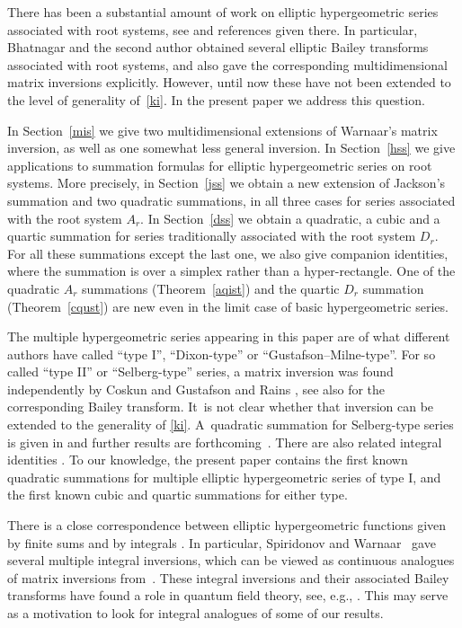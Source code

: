 \documentclass[pdftex]{sigma}%
\numberwithin{equation}{section}
\begin{document}
There has been a substantial amount of work on elliptic hypergeometric series associated with root systems, see \cite{rw} and references given there. In particular, Bhatnagar and the second author \cite{bs} obtained several elliptic Bailey transforms associated with root systems, and also gave the corresponding multidimensional matrix inversions explicitly. However, until now these have not been extended to the level of generality of~\eqref{ki}.
In the present paper we address this question.

In Section~\ref{mis} we give two multidimensional extensions of
Warnaar's matrix inversion, as well as one somewhat less general inversion. In Section~\ref{hss} we give applications to summation formulas for elliptic
hypergeometric series on root systems. More precisely, in Section~\ref{jss}
we obtain a new extension of Jackson's summation and two quadratic summations, in all three cases for series associated with the root system $A_r$.
In Section~\ref{dss} we obtain a quadratic, a cubic and a quartic summation for
series traditionally associated with the root system $D_r$. For all these summations except the last one,
we also give companion identities, where the summation is over a simplex rather than a hyper-rectangle.
One of the quadratic $A_r$ summations (Theorem~\ref{aqist}) and the quartic $D_r$ summation (Theorem~\ref{cqust}) are new even in the limit case of basic hypergeometric series.

The multiple hypergeometric series appearing in this paper are of what different authors have called ``type I'', ``Dixon-type'' or ``Gustafson--Milne-type''. For so called ``type II'' or ``Selberg-type'' series, a matrix inversion was found independently by Coskun and Gustafson \cite[equation~(4.16)]{cg} and Rains \cite[Corollary~4.3]{rai0}, see also \cite{c} for the corresponding Bailey transform.
 It~is not clear whether that inversion can be extended to the generality of \eqref{ki}.
A~quadratic summation for Selberg-type series is given in \cite[Corollary~4.3]{rel} and further results are forth\-coming~\cite{lrw}.
There are also related integral identities \cite{vdb, ra,rel,rai2}.
To our knowledge, the present paper contains the first known quadratic summations for multiple elliptic hypergeometric series of type I, and the first known cubic and quartic summations for either type.

There is a close correspondence between elliptic hypergeometric functions given by finite sums and by integrals \cite{rw}.
In particular, Spiridonov and Warnaar~\cite{sw} gave several multiple integral inversions, which can be viewed as continuous analogues of matrix inversions from~\cite{bs}. These integral inversions and their associated Bailey transforms have found a role in quantum field theory, see, e.g., \cite{bs1,bs2,bln,gy,gk,nr,y}. This may serve as a motivation to look for integral analogues of some of our results.
\end{document}
